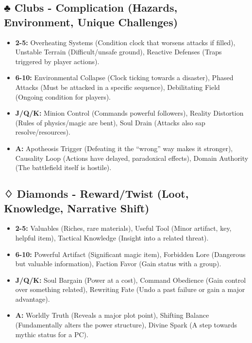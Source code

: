 \subsection{♣ Clubs - Complication (Hazards, Environment, Unique Challenges)}

\begin{itemize}
    \item \textbf{2-5:} Overheating Systems (Condition clock that worsens attacks if filled), Unstable Terrain (Difficult/unsafe ground), Reactive Defenses (Traps triggered by player actions).
    \item \textbf{6-10:} Environmental Collapse (Clock ticking towards a disaster), Phased Attacks (Must be attacked in a specific sequence), Debilitating Field (Ongoing condition for players).
    \item \textbf{J/Q/K:} Minion Control (Commands powerful followers), Reality Distortion (Rules of physics/magic are bent), Soul Drain (Attacks also sap resolve/resources).
    \item \textbf{A:} Apotheosis Trigger (Defeating it the ``wrong'' way makes it stronger), Causality Loop (Actions have delayed, paradoxical effects), Domain Authority (The battlefield itself is hostile).
\end{itemize}

\subsection{♢ Diamonds - Reward/Twist (Loot, Knowledge, Narrative Shift)}

\begin{itemize}
    \item \textbf{2-5:} Valuables (Riches, rare materials), Useful Tool (Minor artifact, key, helpful item), Tactical Knowledge (Insight into a related threat).
    \item \textbf{6-10:} Powerful Artifact (Significant magic item), Forbidden Lore (Dangerous but valuable information), Faction Favor (Gain status with a group).
    \item \textbf{J/Q/K:} Soul Bargain (Power at a cost), Command Obedience (Gain control over something related), Rewriting Fate (Undo a past failure or gain a major advantage).
    \item \textbf{A:} Worldly Truth (Reveals a major plot point), Shifting Balance (Fundamentally alters the power structure), Divine Spark (A step towards mythic status for a PC).
\end{itemize}


